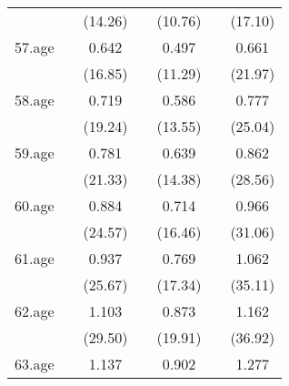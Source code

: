 {\begin{tabular}{l*{6}{c}}
            &                     &     (14.26)         &                     &     (10.76)         &                     &     (17.10)         \\
[1em]
57.age      &                     &       0.642\sym{***}&                     &       0.497\sym{***}&                     &       0.661\sym{***}\\
            &                     &     (16.85)         &                     &     (11.29)         &                     &     (21.97)         \\
[1em]
58.age      &                     &       0.719\sym{***}&                     &       0.586\sym{***}&                     &       0.777\sym{***}\\
            &                     &     (19.24)         &                     &     (13.55)         &                     &     (25.04)         \\
[1em]
59.age      &                     &       0.781\sym{***}&                     &       0.639\sym{***}&                     &       0.862\sym{***}\\
            &                     &     (21.33)         &                     &     (14.38)         &                     &     (28.56)         \\
[1em]
60.age      &                     &       0.884\sym{***}&                     &       0.714\sym{***}&                     &       0.966\sym{***}\\
            &                     &     (24.57)         &                     &     (16.46)         &                     &     (31.06)         \\
[1em]
61.age      &                     &       0.937\sym{***}&                     &       0.769\sym{***}&                     &       1.062\sym{***}\\
            &                     &     (25.67)         &                     &     (17.34)         &                     &     (35.11)         \\
[1em]
62.age      &                     &       1.103\sym{***}&                     &       0.873\sym{***}&                     &       1.162\sym{***}\\
            &                     &     (29.50)         &                     &     (19.91)         &                     &     (36.92)         \\
[1em]
63.age      &                     &       1.137\sym{***}&                     &       0.902\sym{***}&                     &       1.277\sym{***}\\

\end{tabular}}
